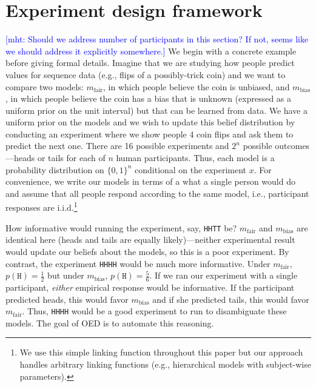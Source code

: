 \documentclass{article}
\newcommand{\mht}[1]{\textcolor{Blue}{[mht: #1]}}
\begin{document}
\section{Experiment design framework}
\label{s:bayes}
\mht{Should we address number of participants in this section? If not, seems like we should address it explicitly somewhere.}
We begin with a concrete example before giving formal details.
Imagine that we are studying how people predict values for sequence data (e.g., flips of a possibly-trick coin) and we want to compare two models: $m_{\text{fair}}$, in which people believe the coin is unbiased, and $m_{\text{bias}}$, in which people believe the coin has a bias that is unknown (expressed as a uniform prior on the unit interval) but that can be learned from data.
We have a uniform prior on the models and we wish to update this belief distribution by conducting an experiment where we show people 4 coin flips and ask them to predict the next one.
There are 16 possible experiments and $2^n$ possible outcomes---heads or tails for each of $n$ human participants.
Thus, each model is a probability distribution on $\{0,1\}^n$ conditional on the experiment $x$.
For convenience, we write our models in terms of a what a single person would do and assume that all people respond according to the same model, i.e., participant responses are i.i.d.\footnote{We use this simple linking function throughout this paper but our approach handles arbitrary linking functions (e.g., hierarchical models with subject-wise parameters).}

How informative would running the experiment, say, \lstinline{HHTT} be?
$m_{\text{fair}}$ and $m_{\text{bias}}$ are identical here (heads and tails are equally likely)---neither experimental result would update our beliefs about the models, so this is a poor experiment.
By contrast, the experiment \lstinline{HHHH} would be much more informative.
Under $m_{\text{fair}}$, $p(\texttt{H}) = \frac{1}{2}$ but under $m_{\text{bias}}$, $p(\texttt{H}) = \frac{5}{6}$.
If we ran our experiment with a single participant, \emph{either} empirical response would be informative.
If the participant predicted heads, this would favor $m_{\text{bias}}$ and if she predicted tails, this would favor $m_{\text{fair}}$.
Thus, \lstinline{HHHH} would be a good experiment to run to disambiguate these models.
The goal of OED is to automate this reasoning.
\end{document}
